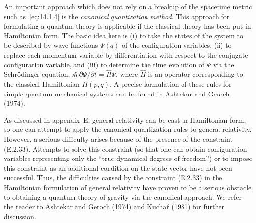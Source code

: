 An important approach which does not rely on a breakup of the spacetime metric
such as~\eqref{eq:14.1.4} is the \emph{canonical quantization method}. This approach for
formulating a quantum theory is applicable if the classical theory has been put in
Hamiltonian form. The basic idea here is (i) to take the states of the system to be
described by wave functions \(\Psi(q)\) of the configuration variables, (ii) to replace each
momentum variable by differentiation with respect to the conjugate configuration
variable, and (iii) to determine the time evolution of \(\Psi\) via the Schrödinger equation,
\(\ii\hbar\,\partial\Psi/\partial t=\widehat H\Psi\), where \(\widehat H\) is an operator corresponding
to the classical Hamiltonian \(H(p,q)\). A precise formulation of these rules for simple
quantum mechanical systems can be found in Ashtekar and Geroch (1974).

As discussed in appendix~E, general relativity can be cast in Hamiltonian form,
so one can attempt to apply the canonical quantization rules to general relativity.
However, a serious difficulty arises because of the presence of the constraint
(E.2.33). Attempts to solve this constraint (so that one can obtain configuration
variables representing only the ``true dynamical degrees of freedom'') or to impose
this constraint as an additional condition on the state vector have not been successful.
Thus, the difficulties caused by the constraint (E.2.33) in the Hamiltonian formulation
of general relativity have proven to be a serious obstacle to obtaining a
quantum theory of gravity via the canonical approach. We refer the reader to
Ashtekar and Geroch (1974) and Kuchař (1981) for further discussion.

